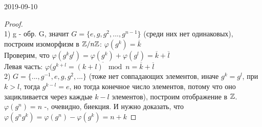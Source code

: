 \documentclass[main]{subfiles}
\begin{document}
\begin{lect} {2019-09-10}
	\begin{proof}\\
	    1) g - обр. G, значит $G=\{e,g,g^2,...,g^{n-1}\}$ (среди них нет одинаковых), построим изоморфизм в $\mathbb{Z} / n \mathbb{Z}$: $\varphi(g^k)=\overline{k}$\\
	    Проверим, что $\varphi(g^k g^l)= \varphi(g^k)+\varphi(g^l)=\overline{k}+\overline{l}$\\
	    Левая часть: $\varphi(g^{k+l}=\overline{(k+l) \mod n} = \overline{k}+\overline{l}$\\
	    2) $G=\{...,g^{-1},e,g,g^2,...\}$ (тоже нет совпадающих элементов, иначе $g^k=g^l$, при $k>l$, тогда $g^{k-l}=e$, но тогда конечное число элементов, потому что оно зацикливается через каждые $k-l$ элементов), построим отображение в $\mathbb{Z}$.\\
	    $\varphi(g^n)=n$ -, очевидно, биекция. И нужно доказать, что $\varphi(g^n g^k)=\varphi(g^n)-\varphi(g^k)=n+k$
	\end{proof}

	\end{lect}
\end{document}
